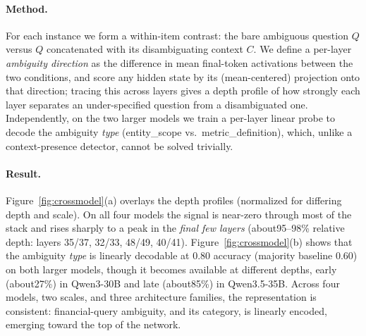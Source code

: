 \paragraph{Method.} For each instance we form a within-item contrast: the bare ambiguous
question $Q$ versus $Q$ concatenated with its disambiguating context $C$. We define a per-layer
\emph{ambiguity direction} as the difference in mean final-token activations between the two
conditions, and score any hidden state by its (mean-centered) projection onto that direction;
tracing this across layers gives a depth profile of how strongly each layer separates an
under-specified question from a disambiguated one. Independently, on the two larger models we
train a per-layer linear probe to decode the ambiguity \emph{type} (entity\_scope vs.\
metric\_definition), which, unlike a context-presence detector, cannot be solved trivially.

\paragraph{Result.} Figure~\ref{fig:crossmodel}(a) overlays the depth profiles (normalized for
differing depth and scale). On all four models the signal is near-zero through most of the stack
and rises sharply to a peak in the \emph{final few layers} (about95--98\% relative depth:
layers 35/37, 32/33, 48/49, 40/41). Figure~\ref{fig:crossmodel}(b) shows that the ambiguity
\emph{type} is linearly decodable at 0.80 accuracy (majority baseline 0.60) on both larger
models, though it becomes available at different depths, early (about27\%) in Qwen3-30B and
late (about85\%) in Qwen3.5-35B. Across four models, two scales, and three architecture
families, the representation is consistent: financial-query ambiguity, and its category, is linearly
encoded, emerging toward the top of the network.

